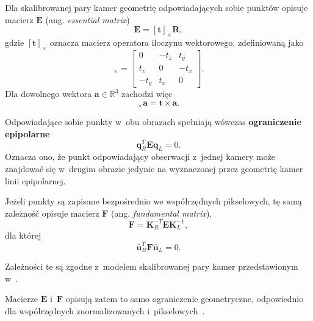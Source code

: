 Dla skalibrowanej pary kamer geometrię odpowiadających sobie punktów opisuje macierz $\mathbf{E}$ (ang. \textit{essential matrix})
\begin{equation}
    \mathbf{E}
    =
    [\mathbf{t}]_{\times}\mathbf{R},
    \label{eq:essential_matrix}
\end{equation}
gdzie $[\mathbf{t}]_{\times}$ oznacza macierz operatora iloczynu
wektorowego, zdefiniowaną jako
\begin{equation}
    [\mathbf{t}]_{\times}
    =
    \begin{bmatrix}
        0    & -t_z & t_y \\
        t_z  & 0    & -t_x \\
        -t_y & t_x  & 0
    \end{bmatrix}.
    \label{eq:cross_product_matrix}
\end{equation}
Dla dowolnego wektora $\mathbf{a}\in\mathbb{R}^3$ zachodzi więc
\begin{equation}
    [\mathbf{t}]_{\times}\mathbf{a}
    =
    \mathbf{t}\times\mathbf{a}.
    \label{eq:cross_product_operator}
\end{equation}

Odpowiadające sobie punkty w~obu obrazach spełniają wówczas \textbf{ograniczenie epipolarne}
\begin{equation}
\mathbf{q}_R^T
\mathbf{E}
\mathbf{q}_L
=
0.
\label{eq:essential_constraint}
\end{equation}
Oznacza ono, że punkt odpowiadający obserwacji z~jednej kamery może znajdować się w~drugim obrazie jedynie na wyznaczonej przez geometrię kamer linii epipolarnej.

Jeżeli punkty są zapisane bezpośrednio we współrzędnych pikselowych,
tę samą zależność opisuje macierz $\mathbf{F}$
(ang. \textit{fundamental matrix}),
\begin{equation}
    \mathbf{F}
    =
    \mathbf{K}_R^{-T}
    \mathbf{E}
    \mathbf{K}_L^{-1},
    \label{eq:fundamental_matrix}
\end{equation}
dla której
\begin{equation}
    \bar{\mathbf{u}}_R^T
    \mathbf{F}
    \bar{\mathbf{u}}_L
    =
    0.
    \label{eq:fundamental_constraint}
\end{equation}

Zależności te są zgodne z~modelem skalibrowanej pary kamer przedstawionym w~\cite{nister2004fivepoint}.

Macierze $\mathbf{E}$ i~$\mathbf{F}$ opisują zatem to samo ograniczenie geometryczne, odpowiednio dla współrzędnych znormalizowanych i~pikselowych~\cite{nister2004fivepoint}.

